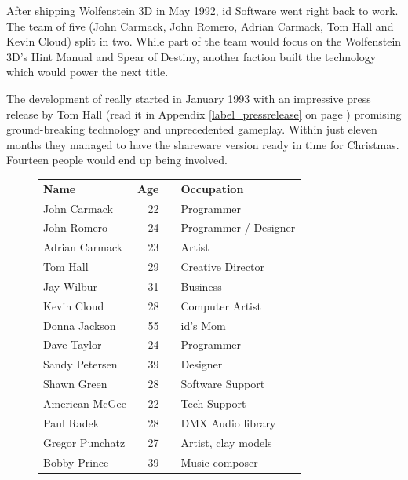 \vspace{-5pt}
After shipping Wolfenstein 3D in May 1992, id Software went right back to work. The team of five (John Carmack, John Romero, Adrian Carmack, Tom Hall and Kevin Cloud) split in two. While part of the team would focus on the Wolfenstein 3D's Hint Manual and Spear of Destiny, another faction built the technology which would power the next title.\\
\par
The development of \doom{} really started in January 1993 with an impressive press release by Tom Hall (read it in Appendix \ref{label_pressrelease} on page \pageref{label_pressrelease}) promising ground-breaking technology and unprecedented gameplay. Within just eleven months they managed to have the shareware version ready in time for Christmas. Fourteen people would end up being involved.\\
\par
 \begin{figure}[H]
\centering  
\begin{tabularx}{\textwidth}{L{0.3} R{0.2} L{0.1} L{0.4}  }
  \textbf{Name} &  \textbf{Age} & &\textbf{Occupation} \\
   John Carmack & 22 &  &Programmer\\
   John Romero & 24 &  &Programmer / Designer\\
   Adrian Carmack\protect{\footnotemark} & 23 &  &Artist\\
   Tom Hall\protect{\footnotemark}  & 29 &  &Creative Director\\
   Jay Wilbur & 31 &  &Business\\
   Kevin Cloud& 28 &  &Computer Artist\\
   Donna Jackson & 55 & &id's Mom\\   
   Dave Taylor & 24 & &Programmer\\
   Sandy Petersen & 39 & &Designer\\
   Shawn Green & 28 & &Software Support\\
   American McGee & 22 & &Tech Support\\
   Paul Radek & 28 & &DMX Audio library\\
   Gregor Punchatz & 27 & &Artist, clay models\\
   Bobby Prince & 39 & & Music composer\\
\end{tabularx}
\label{fig:id Software team}
\end{figure}
\addtocounter{footnote}{-1}



